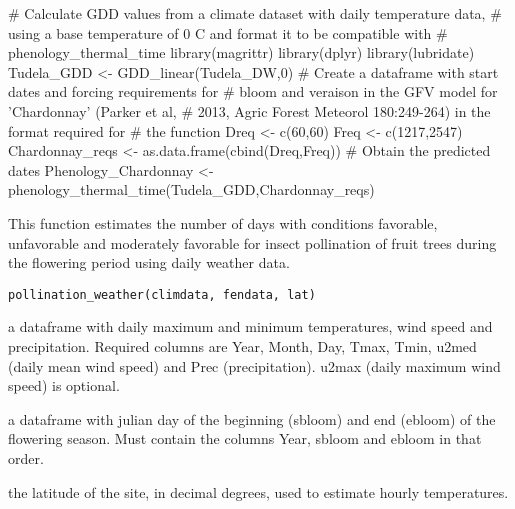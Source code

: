 \documentclass[a4paper]{book}
\begin{document}
\begin{Examples}
\begin{ExampleCode}

# Calculate GDD values from a climate dataset with daily temperature data,
# using a base temperature of 0 C and format it to be compatible with 
# phenology_thermal_time
library(magrittr)
library(dplyr)
library(lubridate)
Tudela_GDD <- GDD_linear(Tudela_DW,0) %
# Create a dataframe with start dates and forcing requirements for
# bloom and veraison in the GFV model for 'Chardonnay' (Parker et al, 
# 2013, Agric Forest Meteorol 180:249-264) in the format required for 
# the function
Dreq <- c(60,60) 
Freq <- c(1217,2547)
Chardonnay_reqs <- as.data.frame(cbind(Dreq,Freq))
# Obtain the predicted dates 
Phenology_Chardonnay <- phenology_thermal_time(Tudela_GDD,Chardonnay_reqs)

\end{ExampleCode}
\end{Examples}
%
\begin{Description}\relax
This function estimates the number of days with conditions
favorable, unfavorable and moderately favorable for insect
pollination of fruit trees during the flowering period using
daily weather data.
\end{Description}
%
\begin{Usage}
\begin{verbatim}
pollination_weather(climdata, fendata, lat)
\end{verbatim}
\end{Usage}
%
\begin{Arguments}
\begin{ldescription}
\item[\code{climdata}] a dataframe with daily maximum and minimum temperatures,
wind speed and precipitation. Required columns are Year, Month, Day,
Tmax, Tmin, u2med (daily mean wind speed) and Prec (precipitation).
u2max (daily maximum wind speed) is optional.

\item[\code{fendata}] a dataframe with julian day of the beginning (sbloom)
and end (ebloom) of the flowering season. Must contain the columns
Year, sbloom and ebloom in that order.

\item[\code{lat}] the latitude of the site, in decimal degrees, used to estimate 
hourly temperatures.
\end{ldescription}
\end{Arguments}
\end{document}
